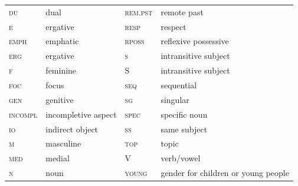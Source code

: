 \documentclass[output=collectionpaper]{langsci/langscibook}
\begin{document}
\begin{tabularx}{\textwidth}{@{}lXlQ@{}}
  \textsc{du}	&	dual	&	\textsc{rem.pst}	&	remote past	\\
  \textsc{e}	&	ergative	&	\textsc{resp}	&	respect	\\
  \textsc{emph}	&	emphatic	&	\textsc{rposs}	&	reflexive possessive	\\
  \textsc{erg}	&	ergative	&	\textsc{s}	&	intransitive subject	\\
  \textsc{f}	&	feminine	&	S 	&	intransitive subject	\\
  \textsc{foc}	&	focus	&	\textsc{seq}	&	sequential	\\
  \textsc{gen}	&	genitive	&	\textsc{sg}	&	singular	\\
  \textsc{incompl}	&	incompletive aspect	&	\textsc{spec}	&	specific noun	\\
  \textsc{io}	&	indirect object	&	\textsc{ss}	&	same subject	\\
  \textsc{m}	&	masculine	&	\textsc{top}	&	topic	\\
  \textsc{med}	&	medial	&	V 	&	verb/vowel	\\
  \textsc{n}	&	noun	&	\textsc{young}	&	gender for children or young people	\\
\end{tabularx}

{\sloppy\printbibliography[heading=subbibliography,notkeyword=this]}

\newpage


\newpage


\label{lastpage:Waelchli}
\end{document}
